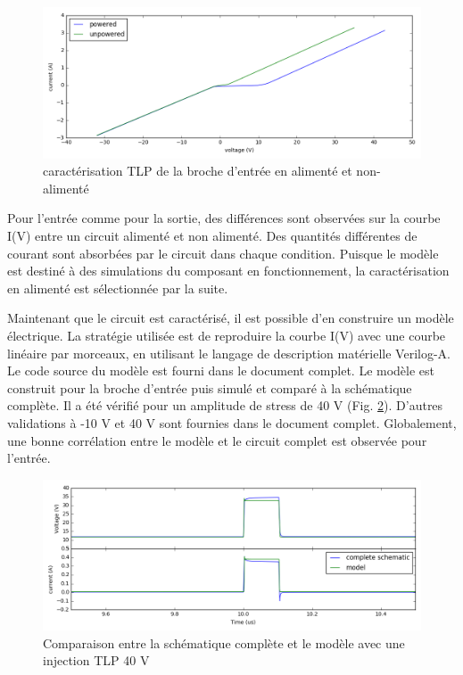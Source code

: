 \begin{figure}[!h]
  \centering
  \includegraphics[width=\textwidth]{src/1/figures/tlp_input_characterization.png}
  \caption{caractérisation TLP de la broche d'entrée en alimenté et non-alimenté}
  \label{fig:tlp-input-cz}
\end{figure}

Pour l'entrée comme pour la sortie, des différences sont observées sur la courbe I(V) entre un circuit alimenté et non alimenté.
Des quantités différentes de courant sont absorbées par le circuit dans chaque condition.
Puisque le modèle est destiné à des simulations du composant en fonctionnement, la caractérisation en alimenté est sélectionnée par la suite.

Maintenant que le circuit est caractérisé, il est possible d'en construire un modèle électrique.
La stratégie utilisée est de reproduire la courbe I(V) avec une courbe linéaire par morceaux, en utilisant le langage de description matérielle Verilog-A.
Le code source du modèle est fourni dans le document complet.
Le modèle est construit pour la broche d'entrée puis simulé et comparé à la schématique complète.
Il a été vérifié pour un amplitude de stress de 40 V (Fig. \ref{fig:compare-model-simu-m10}).
D'autres validations à -10 V et 40 V sont fournies dans le document complet.
Globalement, une bonne corrélation entre le modèle et le circuit complet est observée pour l'entrée.

\begin{figure}[!h]
  \centering
  \includegraphics[width=\textwidth]{src/1/figures/comparison_model_total_40V.png}
  \caption{Comparaison entre la schématique complète et le modèle avec une injection TLP 40 V}
  \label{fig:compare-model-simu-m10}
\end{figure}


